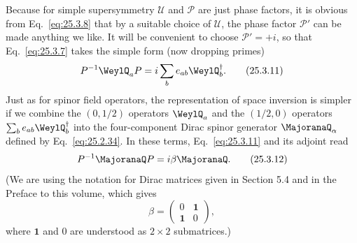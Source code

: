 Because for simple supersymmetry \(\mathcal U\) and \(\mathcal P\) are just
phase factors, it is obvious from Eq.~\eqref{eq:25.3.8} that by a suitable
choice of \(\mathcal U\), the phase factor \(\mathcal P'\) can be made
anything we like. It will be convenient to choose \(\mathcal P'=+i\), so
that Eq.~\eqref{eq:25.3.7} takes the simple form (now dropping primes)
\begin{equation}
P^{-1}\WeylQ_aP
=i\sum_b e_{ab}\WeylQ_b^\dagger.
\tag{25.3.11}\label{eq:25.3.11}
\end{equation}
Just as for spinor field operators, the representation of space inversion is
simpler if we combine the \((0,1/2)\) operators \(\WeylQ_a\) and the
\((1/2,0)\) operators \(\sum_b e_{ab}\WeylQ_b^\dagger\) into the
four-component Dirac spinor generator \(\MajoranaQ_\alpha\) defined by
Eq.~\eqref{eq:25.2.34}. In these terms, Eq.~\eqref{eq:25.3.11} and its
adjoint read
\begin{equation}
P^{-1}\MajoranaQ P=i\beta\MajoranaQ.
\tag{25.3.12}\label{eq:25.3.12}
\end{equation}
(We are using the notation for Dirac matrices given in Section 5.4 and in the
Preface to this volume, which gives
\[
\beta=
\begin{pmatrix}
0&\mathbf{1}\\
\mathbf{1}&0
\end{pmatrix},
\]
where \(\mathbf{1}\) and \(0\) are understood as \(2\times2\) submatrices.)

